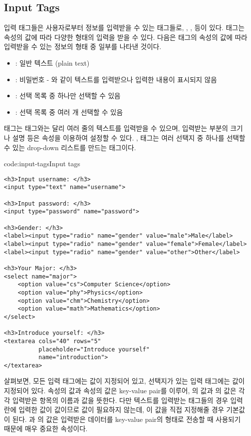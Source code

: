 \subsection*{Input Tags}
입력 태그들은 사용자로부터 정보를 입력받을 수 있는 태그들로, , ,  등이 있다.  태그는  속성의 값에 따라 다양한 형태의 입력을 받을 수 있다. 다음은  태그의  속성의 값에 따라 입력받을 수 있는 정보의 형태 중 일부를 나타낸 것이다.

\begin{itemize}
    \item {}: 일반 텍스트 (plain text)
    \item {}: 비밀번호 - 와 같이 텍스트를 입력받으나 입력한 내용이 표시되지 않음
    \item {}: 선택 목록 중 하나만 선택할 수 있음
    \item {}: 선택 목록 중 여러 개 선택할 수 있음
\end{itemize}

 태그는  태그와는 달리 여러 줄의 텍스트를 입력받을 수 있으며, 입력받는 부분의 크기나 설명 등은 속성을 이용하여 설정할 수 있다. ,  태그는 여러 선택지 중 하나를 선택할 수 있는 drop-down 리스트를 만드는 태그이다.

\begin{codeenv}{code:input-tags}{Input tags}\begin{verbatim}
<h3>Input username: </h3>
<input type="text" name="username">

<h3>Input password: </h3>
<input type="password" name="password">

<h3>Gender: </h3>
<label><input type="radio" name="gender" value="male">Male</label>
<label><input type="radio" name="gender" value="female">Female</label>
<label><input type="radio" name="gender" value="other">Other</label>

<h3>Your Major: </h3>
<select name="major">
    <option value="cs">Computer Science</option>
    <option value="phy">Physics</option>
    <option value="chm">Chemistry</option>
    <option value="math">Mathematics</option>
</select>

<h3>Introduce yourself: </h3>
<textarea cols="40" rows="5"
          placeholder="Introduce yourself"
          name="introduction">
</textarea>
\end{verbatim}
\end{codeenv}

\를 살펴보면, 모든 입력 태그에는  값이 지정되어 있고, 선택지가 있는 입력 태그에는  값이 지정되어 있다.  속성의 값과  속성의 값은 key-value pair를 이루어, 의 값과 의 값은 각각 입력받은 항목의 이름과 값을 뜻한다. 다만 텍스트를 입력받는 태그들의 경우 입력란에 입력한 값이  값이므로  값이 필요하지 않는데, 이 값을 직접 지정해줄 경우 기본값이 된다. 과 의 값은 입력받은 데이터를 key-value pair의 형태로 전송할 때 사용되기 때문에 매우 중요한 속성이다.

